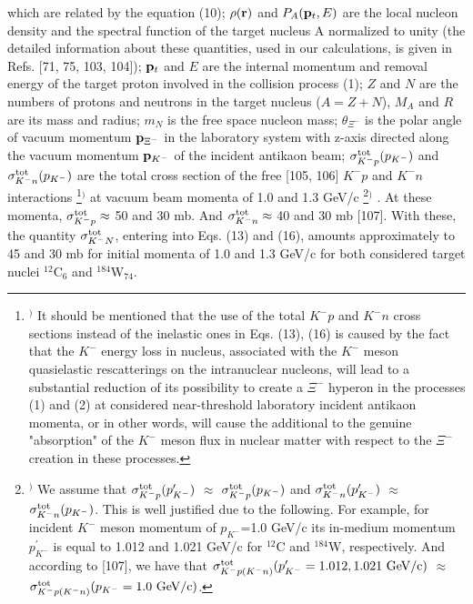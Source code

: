 \documentclass[12pt]{article}
\begin{document}
which are related by the equation (10);
$\rho({\bf r})$ and $P_A({\bf p}_t,E)$ are the local nucleon density and the
spectral function of the target nucleus A normalized to unity
(the detailed information about these quantities, used in our calculations, is given
in Refs. [71, 75, 103, 104]);
${\bf p}_t$ and $E$ are the internal momentum and removal energy of the target proton
involved in the collision process (1);
$Z$ and $N$ are the numbers of protons and neutrons in the target nucleus ($A=Z+N$),
$M_{A}$  and $R$ are its mass and radius; $m_N$ is the free space nucleon mass;
$\theta_{\Xi^-}$ is the polar angle of
vacuum momentum ${\bf p}_{{\Xi^-}}$ in the laboratory system with z-axis directed along the vacuum
momentum ${\bf p}_{{K^-}}$ of the incident antikaon beam;
$\sigma_{{K^-}p}^{\rm tot}(p_{K^-})$ and $\sigma_{{K^-}n}^{\rm tot}(p_{K^-})$
are the total cross section of the free [105, 106] ${K^-}p$ and ${K^-}n$ interactions
\footnote{$^)$ It should be mentioned that the use of the total ${K^-}p$ and ${K^-}n$
cross sections instead of the inelastic ones in Eqs. (13), (16)
is caused by the fact that the $K^-$ energy loss in nucleus, associated with the $K^-$ meson
quasielastic rescatterings on the intranuclear nucleons, will lead to a substantial reduction
of its possibility to create a $\Xi^-$ hyperon in the processes (1) and (2) at considered near-threshold
laboratory incident antikaon momenta, or in other words, will cause the additional to the genuine
"absorption" of the $K^-$ meson flux in nuclear matter with respect to the $\Xi^-$ creation in
these processes.}$^)$
at vacuum beam momenta of 1.0 and 1.3 GeV/c
\footnote{$^)$ We assume that $\sigma_{{K^-}p}^{\rm tot}(p^{\prime}_{K^-})$ $\approx$
$\sigma_{{K^-}p}^{\rm tot}(p_{K^-})$ and $\sigma_{{K^-}n}^{\rm tot}(p^{\prime}_{K^-})$ $\approx$
$\sigma_{{K^-}n}^{\rm tot}(p_{K^-})$. This is well justified due to the following.
For example, for incident $K^-$ meson momentum of $p_{K^-}$=1.0 GeV/c
its in-medium momentum $p^{\prime}_{K^-}$ is equal to 1.012 and 1.021 GeV/c for $^{12}$C and $^{184}$W,
respectively. And according to [107], we have that
$\sigma_{{K^-}p(K^-n)}^{\rm tot}(p^{\prime}_{K^-}=1.012, 1.021~{\rm GeV/c})$ $\approx$
$\sigma_{{K^-}p(K^-n)}^{\rm tot}(p_{K^-}=1.0~{\rm GeV/c})$.}$^)$
.
At these momenta, $\sigma_{{K^-}p}^{\rm tot}\approx$ 50 and 30 mb. And
$\sigma_{{K^-}n}^{\rm tot}\approx$ 40 and 30 mb [107]. With these, the quantity $\sigma_{{K^-}N}^{\rm tot}$,
entering into Eqs. (13) and (16), amounts approximately to 45 and 30 mb for initial momenta of
1.0 and 1.3 GeV/c for both considered target nuclei $^{12}$C$_6$ and $^{184}$W$_{74}$.
\end{document}

